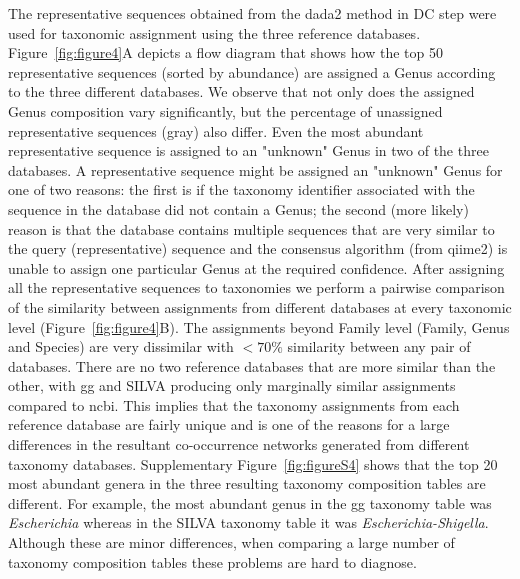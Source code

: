   The representative sequences obtained from the \ac{dada2} method in DC step were used for taxonomic assignment using the three reference databases.
  Figure~\ref{fig:figure4}A depicts a flow diagram that shows how the top 50 representative sequences (sorted by abundance) are assigned a Genus according to the three different databases.
  We observe that not only does the assigned Genus composition vary significantly, but the percentage of unassigned representative sequences (gray) also differ.
  Even the most abundant representative sequence is assigned to an "unknown" Genus in two of the three databases.
  A representative sequence might be assigned an "unknown" Genus for one of two reasons: the first is if the taxonomy identifier associated with the sequence in the database did not contain a Genus; the second (more likely) reason is that the database contains multiple sequences that are very similar to the query (representative) sequence and the consensus algorithm (from \ac{qiime2}) is unable to assign one particular Genus at the required confidence.
  After assigning all the representative sequences to taxonomies we perform a pairwise comparison of the similarity between assignments from different databases at every taxonomic level (Figure~\ref{fig:figure4}B).
  The assignments beyond Family level (Family, Genus and Species) are very dissimilar with $<70\%$ similarity between any pair of databases.
  There are no two reference databases that are more similar than the other, with \ac{gg} and SILVA producing only marginally similar assignments compared to \ac{ncbi}.
  This implies that the taxonomy assignments from each reference database are fairly unique and is one of the reasons for a large differences in the resultant co-occurrence networks generated from different taxonomy databases.
  Supplementary Figure~\ref{fig:figureS4} shows that the top 20 most abundant genera in the three resulting taxonomy composition tables are different.
  For example, the most abundant genus in the \ac{gg} taxonomy table was \textit{Escherichia} whereas in the SILVA taxonomy table it was \textit{Escherichia-Shigella}.
  Although these are minor differences, when comparing a large number of taxonomy composition tables these problems are hard to diagnose.

